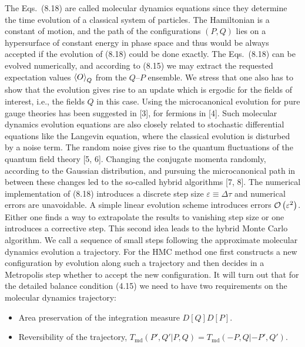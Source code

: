 The Eqs.~(8.18) are called molecular dynamics equations since they determine
the time evolution of a classical system of particles. The Hamiltonian is a
constant of motion, and the path of the configurations $(P,Q)$ lies on a
hypersurface of constant energy in phase space and thus would be always
accepted if the evolution of (8.18) could be done exactly.
The Eqs.~(8.18) can be evolved numerically, and according to (8.15) we may
extract the requested expectation values $\left\langle O \right\rangle_Q$ from the $Q$--$P$
ensemble. We stress that one also has to show that the evolution gives rise to
an update which is ergodic for the fields of interest, i.e., the fields $Q$ in
this case.
Using the microcanonical evolution for pure gauge theories has been suggested
in [3], for fermions in [4]. Such molecular dynamics evolution equations are
also closely related to stochastic differential equations like the Langevin
equation, where the classical evolution is disturbed by a noise term. The
random noise gives rise to the quantum fluctuations of the quantum field theory
[5, 6]. Changing the conjugate momenta randomly, according to the Gaussian
distribution, and pursuing the microcanonical path in between these changes led
to the so-called hybrid algorithms [7, 8].
The numerical implementation of (8.18) introduces a discrete step size
$\varepsilon \equiv \Delta\tau$ and numerical errors are unavoidable. A simple
linear evolution scheme introduces errors $\mathcal{O}\left(\varepsilon^2\right)$. Either one
finds a way to extrapolate the results to vanishing step size or one introduces
a corrective step. This second idea leads to the hybrid Monte Carlo algorithm.
We call a sequence of small steps following the approximate molecular dynamics
evolution a trajectory. For the HMC method one first constructs a new
configuration by evolution along such a trajectory and then decides in a
Metropolis step whether to accept the new configuration.
It will turn out that for the detailed balance condition (4.15) we need to have
two requirements on the molecular dynamics trajectory:
\begin{itemize}
  \item Area preservation of the integration measure $D[Q]D[P]$.
  \item Reversibility of the trajectory,
        $T_{\mathrm{md}}(P',Q'|P,Q) = T_{\mathrm{md}}(-P,Q|-P',Q')$.
\end{itemize}

